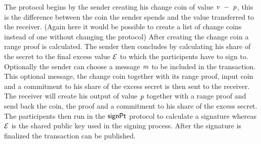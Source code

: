 The protocol begins by the sender creating his change coin of value $\mathit{v} ~-~ \mathit{p}$, this is the difference between the coin the sender spends and the value transferred to the receiver.
(Again here it would be possible to create a list of change coins instead of one without changing the protocol) After creating the change coin a range proof is calculated.
The sender then concludes by calculating his share of the secret to the final excess value $\mathcal{E}$ to which the participents have to sign to. Optionally the sender can choose a message $\mathit{m}$
to be included in the transaction. This optional message, the change coin together with its range proof, input coin and a commitment to his share of the excess secret is then sent to the receiver.
The receiver will create his output of value $\mathit{p}$ together with a range proof and send back the coin, the proof and a commitment to his share of the excess secret.
The participents then run in the $\mathsf{signPt}$ protocol to calculate a signature whereas $\mathcal{E}$ is the shared public key used in the signing process. After the signature is finalized
the transaction can be published.
